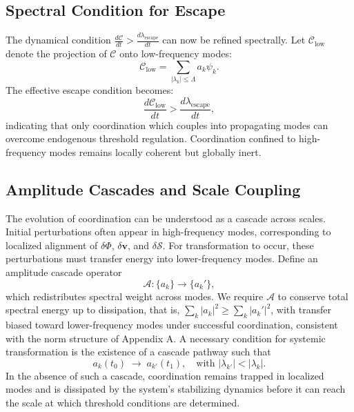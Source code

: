 \documentclass[11pt, a4paper]{article}
\begin{document}
\subsection{Spectral Condition for Escape}

The dynamical condition $\frac{d\mathcal{C}}{dt} > \frac{d\lambda_{\mathrm{escape}}}{dt}$ can now be refined spectrally. Let $\mathcal{C}_{\mathrm{low}}$ denote the projection of $\mathcal{C}$ onto low-frequency modes:
\begin{equation}
\mathcal{C}_{\mathrm{low}} = \sum_{|\lambda_k| \leq \Lambda} a_k \psi_k.
\end{equation}
The effective escape condition becomes:
\begin{equation}
\frac{d\mathcal{C}_{\mathrm{low}}}{dt} > \frac{d\lambda_{\mathrm{escape}}}{dt},
\end{equation}
indicating that only coordination which couples into propagating modes can overcome endogenous threshold regulation. Coordination confined to high-frequency modes remains locally coherent but globally inert.

\subsection{Amplitude Cascades and Scale Coupling}

The evolution of coordination can be understood as a cascade across scales. Initial perturbations often appear in high-frequency modes, corresponding to localized alignment of $\delta\Phi$, $\delta\mathbf{v}$, and $\delta\mathcal{S}$. For transformation to occur, these perturbations must transfer energy into lower-frequency modes. Define an amplitude cascade operator
\begin{equation}
\mathcal{A} : \{a_k\} \longrightarrow \{a_k'\},
\end{equation}
which redistributes spectral weight across modes. We require $\mathcal{A}$ to conserve total spectral energy up to dissipation, that is, $\sum_k |a_k|^2 \geq \sum_k |a_k'|^2$, with transfer biased toward lower-frequency modes under successful coordination, consistent with the norm structure of Appendix A. A necessary condition for systemic transformation is the existence of a cascade pathway such that
\begin{equation}
a_k(t_0) \;\rightarrow\; a_{k'}(t_1), \quad \text{with } |\lambda_{k'}| < |\lambda_k|.
\end{equation}
In the absence of such a cascade, coordination remains trapped in localized modes and is dissipated by the system's stabilizing dynamics before it can reach the scale at which threshold conditions are determined.
\end{document}
